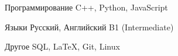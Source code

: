 

\begin{cvskills}

%


  \cvskill
    {Программирование} %
    {C++, Python, JavaScript} %

  \cvskill
    {Языки} %
    {Русский, Английский B1 (Intermediate)} %

\cvskill
    {Другое} %
    {SQL, LaTeX, Git, Linux} %

\end{cvskills}
